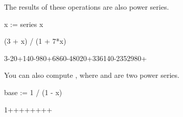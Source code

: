 {{{{{{{{{{{{{{\begin{xtc}
\begin{xtccomment}
The results of these operations are also power series.
\end{xtccomment}
\begin{spadsrc}
x := series x 
\end{spadsrc}
\begin{TeXOutput}
\begin{fricasmath}{1}
%
\end{fricasmath}
\end{TeXOutput}
\end{xtc}
\begin{xtc}
\begin{xtccomment}
\end{xtccomment}
\begin{spadsrc}
(3 + x) / (1 + 7*x)
\end{spadsrc}
\begin{TeXOutput}
\begin{fricasmath}{2}
3-{20\TIMES {}}+140\TIMES {}-{980\TIMES {}}+6860\TIMES {}-{48020\TIMES {}}+336140\TIMES {}-{2352980\TIMES {}}+%
\end{fricasmath}
\end{TeXOutput}
\end{xtc}
\begin{xtc}
\begin{xtccomment}
You can also compute , where  and 
are two power series.
\end{xtccomment}
\begin{spadsrc}
base := 1 / (1 - x) 
\end{spadsrc}
\begin{TeXOutput}
\begin{fricasmath}{3}
1++++++++%
%
\end{fricasmath}
\end{TeXOutput}
\end{xtc}
%
\begin{xtc}

\end{xtc}}}}}}}}}}}}}}}
